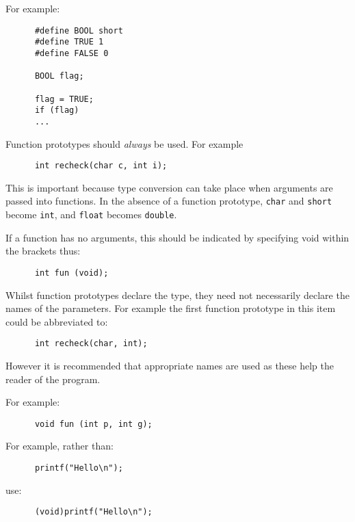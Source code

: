 
For example:
\begin{verbatim}
      #define BOOL short
      #define TRUE 1
      #define FALSE 0

      BOOL flag;
  
      flag = TRUE;
      if (flag)  
      ...
\end{verbatim}


Function prototypes should {\sl always\/} be used.
For example
\begin{verbatim}
      int recheck(char c, int i);
\end{verbatim}
This is important because type conversion can take place when arguments are 
passed into functions.
In the absence of a function prototype,  {\tt char} and {\tt short} 
become {\tt int}, and {\tt float} becomes {\tt double}.

If a function has no arguments, this should be indicated by specifying void 
within the brackets thus:
\begin{verbatim}
      int fun (void);
\end{verbatim}

Whilst function prototypes declare the type, they  need not necessarily
declare the names of the parameters. For example the first function prototype
in this item could be abbreviated to:
\begin{verbatim}
      int recheck(char, int);
\end{verbatim}
However it is recommended that appropriate names are used as these help
the reader of the program.  


For example:
\begin{verbatim}
      void fun (int p, int g);
\end{verbatim}



For example, rather than:
\begin{verbatim}
      printf("Hello\n");
\end{verbatim}
use:
\begin{verbatim}
      (void)printf("Hello\n");
\end{verbatim}

